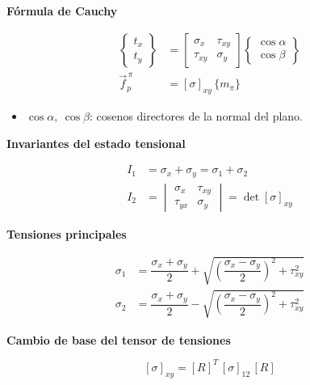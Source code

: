 \documentclass[10pt,a4paper]{article}
\begin{document}
\begin{tcolorbox}[itembox]
\textbf{Fórmula de Cauchy}\par
\[
\begin{aligned}\begin{Bmatrix}t_x\\ t_y\end{Bmatrix}&=\begin{bmatrix}\sigma_x&\tau_{xy}\\ \tau_{xy}&\sigma_y\end{bmatrix}\begin{Bmatrix}\cos\alpha\\ \cos\beta\end{Bmatrix}\\ \vec f_p^{\,\pi}&=[\sigma]_{xy}\,\{m_\pi\}\end{aligned}
\]
{\small\begin{itemize}[leftmargin=*,nosep,label={--}]
\item $\cos\alpha,\ \cos\beta$: cosenos directores de la normal del plano.
\end{itemize}}
\end{tcolorbox}

\begin{tcolorbox}[itembox]
\textbf{Invariantes del estado tensional}\par
\[
\begin{aligned}I_1&=\sigma_x+\sigma_y=\sigma_1+\sigma_2\\ I_2&=\begin{vmatrix}\sigma_x&\tau_{xy}\\ \tau_{yx}&\sigma_y\end{vmatrix}=\det[\sigma]_{xy}\end{aligned}
\]
\end{tcolorbox}

\begin{tcolorbox}[itembox]
\textbf{Tensiones principales}\par
\[
\begin{aligned}\sigma_1&=\dfrac{\sigma_x+\sigma_y}{2}+\sqrt{\left(\dfrac{\sigma_x-\sigma_y}{2}\right)^{2}+\tau_{xy}^{2}}\\ \sigma_2&=\dfrac{\sigma_x+\sigma_y}{2}-\sqrt{\left(\dfrac{\sigma_x-\sigma_y}{2}\right)^{2}+\tau_{xy}^{2}}\end{aligned}
\]
\end{tcolorbox}

\begin{tcolorbox}[itembox]
\textbf{Cambio de base del tensor de tensiones}\par
\[
[\sigma]_{xy}=[R]^{T}\,[\sigma]_{12}\,[R]
\]
\smallskip{}\par
\end{tcolorbox}
\end{document}
